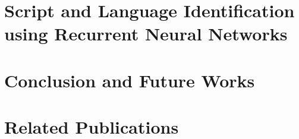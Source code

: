 \documentclass[11pt]{book}
\begin{document}
\chapter{Script and Language Identification using Recurrent Neural Networks}
\label{ch:chap4}



\chapter{Conclusion and Future Works}
\label{ch:conc}



\chapter*{Related Publications}
\label{ch:relatedPubs}




 
\end{document}
